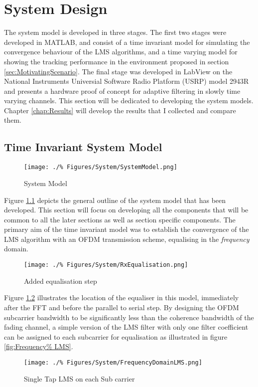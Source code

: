 \chapter{System Design}
\label{chap:System}
The system model is developed in three stages. %
The first two stages were developed in MATLAB, %
and consist of a time invariant model %
for simulating the convergence behaviour of %
the LMS algorithms, and a time varying %
model for showing the tracking performance %
in the environment proposed in section %
\ref{sec:MotivatingScenario}. The %
final stage was developed in LabView on the %
National Instruments Universial Software Radio %
Platform (USRP) model 2943R and presents %
a hardware proof of concept for adaptive %
filtering in slowly time varying channels. %
This section will be dedicated to developing %
the system models. Chapter \ref{chap:Results} %
will develop the results that I collected %
and compare them. 

\section{Time Invariant System Model}
\label{sec:TIModel}
\FloatBarrier
\begin{figure}[ht]
	\texttt{[image: ./\%
	Figures/System/SystemModel.png]}
	\caption{System Model}
	\label{fig:SysModel}
\end{figure}
Figure \ref{fig:SysModel} depicts the general %
outline of the system model that has been %
developed. This section will focus on %
developing all the components that will %
be common to all the later sections as %
well as section specific components.
\FloatBarrier
The primary aim of the time invariant %
model was to establish the convergence %
of the LMS algorithm with an OFDM %
transmission scheme, equalising in the %
\emph{frequency} domain.
\begin{figure}[ht]
	\texttt{[image: ./\%
	Figures/System/RxEqualisation.png]}
	\caption{Added equalisation step}
	\label{fig:RxEqualiser}
\end{figure}
Figure \ref{fig:RxEqualiser} illustrates %
the location of the equaliser in this model, %
immediately after the FFT and before the %
parallel to serial step. By designing %
the OFDM subcarrier bandwidth to be %
significantly less than the coherence %
bandwidth of the fading channel, a simple %
version of the LMS filter with only one %
filter coefficient can be assigned to %
each subcarrier for equalisation as %
illustrated in figure \ref{fig:Frequency%
LMS}.
\FloatBarrier
\begin{figure}[ht]
	\centering
	\texttt{[image: ./\%
	Figures/System/FrequencyDomainLMS.png]}
	\caption{Single Tap LMS on each Sub%
	carrier}
	\label{fig:FrequencyLMS}
\end{figure}
\FloatBarrier

